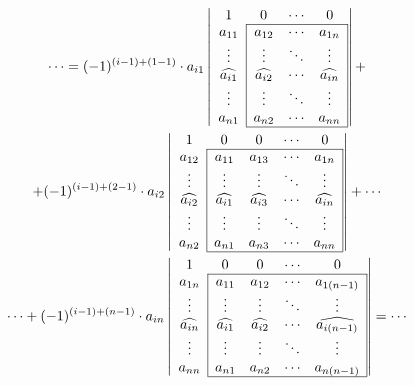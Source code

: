 \begin{multline*}
\cdots=
(-1)^{(i-1)+(1-1)}\cdot a_{i1}\left|
\begin{array}{cccc}
1 & 0 & \cdots & 0 \\
\cline{2-4}
a_{11} & \multicolumn{1}{|c}{a_{12}} & \cdots & \multicolumn{1}{c|}{a_{1n}} \\
\vdots & \multicolumn{1}{|c}{\vdots} & \ddots & \multicolumn{1}{c|}{\vdots} \\
\widehat{a_{i1}} & \multicolumn{1}{|c}{\widehat{a_{i2}}} & \cdots & \multicolumn{1}{c|}{\widehat{a_{in}}} \\
\vdots & \multicolumn{1}{|c}{\vdots} & \ddots & \multicolumn{1}{c|}{\vdots} \\
a_{n1} & \multicolumn{1}{|c}{a_{n2}} & \cdots & \multicolumn{1}{c|}{a_{nn}} \\
\cline{2-4}
\end{array}\right|
+ \\ +
(-1)^{(i-1)+(2-1)}\cdot a_{i2}\left|
\begin{array}{ccccc}
1 & 0 & 0 & \cdots & 0 \\
\cline{2-5}
a_{12} & \multicolumn{1}{|c}{a_{11}} & a_{13} & \cdots & \multicolumn{1}{c|}{a_{1n}} \\
\vdots & \multicolumn{1}{|c}{\vdots} & \vdots & \ddots & \multicolumn{1}{c|}{\vdots} \\
\widehat{a_{i2}} & \multicolumn{1}{|c}{\widehat{a_{i1}}} & \widehat{a_{i3}} & \cdots & \multicolumn{1}{c|}{\widehat{a_{in}}} \\
\vdots & \multicolumn{1}{|c}{\vdots} & \vdots & \ddots & \multicolumn{1}{c|}{\vdots} \\
a_{n2} & \multicolumn{1}{|c}{a_{n1}} & a_{n3} & \cdots & \multicolumn{1}{c|}{a_{nn}} \\
\cline{2-5}
\end{array}\right|
+\cdots \\ \cdots+
(-1)^{(i-1)+(n-1)}\cdot a_{in}\left|
\begin{array}{ccccc}
1 & 0 & 0 & \cdots & 0 \\
\cline{2-5}
a_{1n} & \multicolumn{1}{|c}{a_{11}} & a_{12} & \cdots & \multicolumn{1}{c|}{a_{1(n-1)}} \\
\vdots & \multicolumn{1}{|c}{\vdots} & \vdots & \ddots & \multicolumn{1}{c|}{\vdots} \\
\widehat{a_{in}} & \multicolumn{1}{|c}{\widehat{a_{i1}}} & \widehat{a_{i2}} & \cdots & \multicolumn{1}{c|}{\widehat{a_{i(n-1)}}} \\
\vdots & \multicolumn{1}{|c}{\vdots} & \vdots & \ddots & \multicolumn{1}{c|}{\vdots} \\
a_{nn} & \multicolumn{1}{|c}{a_{n1}} & a_{n2} & \cdots & \multicolumn{1}{c|}{a_{n(n-1)}} \\
\cline{2-5}
\end{array}\right|
=\cdots
\end{multline*}

